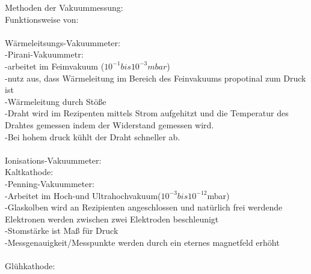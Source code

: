 	   Methoden der Vakuummessung:\\
	   	Funktionsweise von:\\
\\
		Wärmeleitsungs-Vakuummeter:\\
			-Pirani-Vakuummetr:\\
				-arbeitet im Feimvakuum ($10^{-1} bis 10^{-3}mbar$)\\
				-nutz aus, dass Wärmeleitung im Bereich des Feinvakuums propotinal zum Druck ist\\
				-Wärmeleitung durch Stöße\\
				-Draht wird im Rezipenten mittels Strom aufgehitzt und die Temperatur des Drahtes gemessen indem der Widerstand gemessen wird.\\
				-Bei hohem druck kühlt der Draht schneller ab.\\
				\\
		Ionisations-Vakuummeter:\\
			Kaltkathode:\\
				-Penning-Vakuummeter:\\
					-Arbeitet im Hoch-und Ultrahochvakuum($10^{-3} bis 10^{-12}$mbar)\\
					-Glaskolben wird an Rezipienten angeschlossen und natürlich frei werdende Elektronen werden zwischen zwei Elektroden beschleunigt\\
					-Stomstärke ist Maß für Druck\\
					-Messgenauigkeit/Messpunkte werden durch ein eternes magnetfeld erhöht\\
					\\
			Glühkathode:\\
